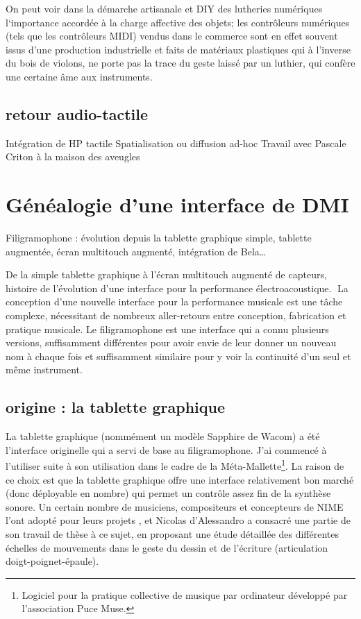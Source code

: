 On peut voir dans la démarche artisanale et \gls{DIY} des lutheries numériques l`importance accordée à la charge affective des objets; les contrôleurs numériques (tels que les contrôleurs MIDI) vendus dans le commerce sont en effet souvent issus d'une production industrielle et faits de matériaux plastiques qui à l'inverse du bois de violons, ne porte pas la trace du geste laissé par un luthier, qui confère une certaine âme aux instruments.

\subsection{retour audio-tactile}
Intégration de HP tactile
Spatialisation ou diffusion ad-hoc
Travail avec Pascale Criton à la maison des aveugles


\section{Généalogie d’une interface de DMI}
\label{sec:interfaces:sec1}

Filigramophone : évolution depuis la tablette graphique simple, tablette augmentée, écran multitouch augmenté, intégration de Bela…

De la simple tablette graphique à l’écran multitouch augmenté de capteurs, histoire de l’évolution d’une interface pour la performance électroacoustique.
La conception d’une nouvelle interface pour la performance musicale est une tâche complexe, nécessitant de nombreux aller-retours entre conception, fabrication et pratique musicale. Le filigramophone est une interface qui a connu plusieurs versions, suffisamment différentes pour avoir envie de leur donner un nouveau nom à chaque fois et suffisamment similaire pour y voir la continuité d’un seul et même instrument.

\subsection{origine : la tablette graphique}
La tablette graphique (nommément un modèle Sapphire de Wacom) a été l’interface originelle qui a servi de base au filigramophone. J’ai commencé à l’utiliser suite à son utilisation dans le cadre de la Méta-Mallette\footnote{Logiciel pour la pratique collective de musique par ordinateur développé par l’association Puce Muse.}. La raison de ce choix est que la tablette graphique offre une interface relativement bon marché (donc déployable en nombre) qui permet un contrôle assez fin de la synthèse sonore.
Un certain nombre de musiciens, compositeurs et concepteurs de NIME l’ont adopté pour leurs projets \cite{zbyszynski_ten_2007}, et Nicolas d’Alessandro a consacré une partie de son travail de thèse \cite{dalessandro_realtime_2009} à ce sujet, en proposant une étude détaillée des différentes échelles de mouvements dans le geste du dessin et de l'écriture (articulation doigt-poignet-épaule).

